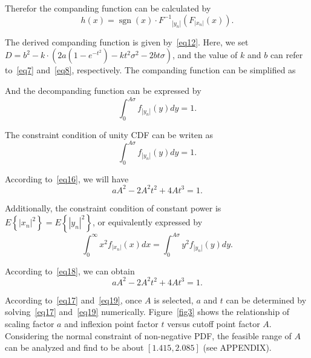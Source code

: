 \documentclass{ccjnl}
\begin{document}
Therefor the companding function can be calculated by
\begin{equation}
h(x) = \operatorname{sgn} (x) \cdot {F^{ - 1}}_{\left| {{y_n}} \right|}({F_{\left| {{x_n}} \right|}}(x)).
\label{eq12}
\end{equation}

The derived companding function is given by~\eqref{eq12}. Here, we set $D = {b^2} - k \cdot \left( {2a\left( {1 - {e^{ - {t^2}}}} \right) - k{t^2}{\sigma ^2} - 2bt\sigma } \right)$, and the value of $k$ and $b$ can refer to~\eqref{eq7} and~\eqref{eq8}, respectively. The companding function can be simplified as 

And the decompanding function can be expressed by 
\begin{equation}
\int_0^{A\sigma } {{f_{\left| {{y_n}} \right|}}(y)dy = 1} .
\label{eq15}
\end{equation}

The constraint condition of unity CDF can be writen as
\begin{equation}
\int_0^{A\sigma } {{f_{\left| {{y_n}} \right|}}(y)dy = 1} .
\label{eq16}
\end{equation}

According to~\eqref{eq16}, we will have
\begin{equation}
a{A^2} - 2{A^2}{t^2} + 4A{t^3}= 1.
\label{eq17}
\end{equation}

Additionally, the constraint condition of constant power is $E\left\{\left|x_{n}\right|^{2}\right\}=E\left\{\left|y_{n}\right|^{2}\right\}$, or equivalently expressed by
\begin{equation}
\int_0^\infty  {{x^2}{f_{\left| {{x_n}} \right|}}(x)dx}  = \int_0^{A\sigma } {{y^2}{f_{\left| {{y_n}} \right|}}(y)dy} .
\label{eq18}
\end{equation}

According to~\eqref{eq18}, we can obtain 
\begin{equation}
a{A^2} - 2{A^2}{t^2} + 4A{t^3}= 1.
\label{eq19}
\end{equation}

According to~\eqref{eq17} and~\eqref{eq19}, once $A$ is selected, $a$ and $t$ can be determined by solving~\eqref{eq17} and~\eqref{eq19} numerically. Figure~\ref{fig3} shows the relationship of scaling factor $a$ and inflexion point factor $t$ 
versus cutoff point factor $A$. Considering the normal constraint of non-negative PDF, the feasible range of $A$ can be analyzed and find to be about $[1.415, 2.085]$ (see APPENDIX).
\end{document}

